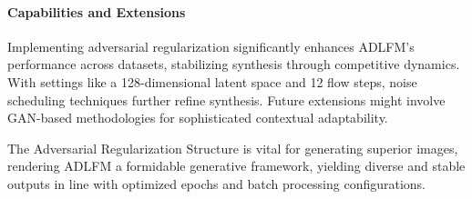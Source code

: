 \paragraph{Capabilities and Extensions}
Implementing adversarial regularization significantly enhances ADLFM's performance across datasets, stabilizing synthesis through competitive dynamics. With settings like a 128-dimensional latent space and 12 flow steps, noise scheduling techniques further refine synthesis. Future extensions might involve GAN-based methodologies for sophisticated contextual adaptability.

The Adversarial Regularization Structure is vital for generating superior images, rendering ADLFM a formidable generative framework, yielding diverse and stable outputs in line with optimized epochs and batch processing configurations.
